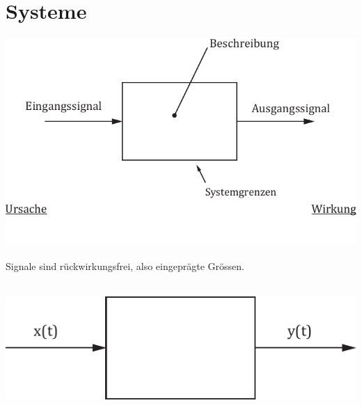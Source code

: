 \section{Systeme}
\includegraphics[width = \linewidth]{images/systeme.pdf}
\\\\
Signale sind rückwirkungsfrei, also eingeprägte Grössen.
\\\\
\begin{center}
	\includegraphics[scale = 0.5]{images/system_bsp.pdf}
\end{center}
